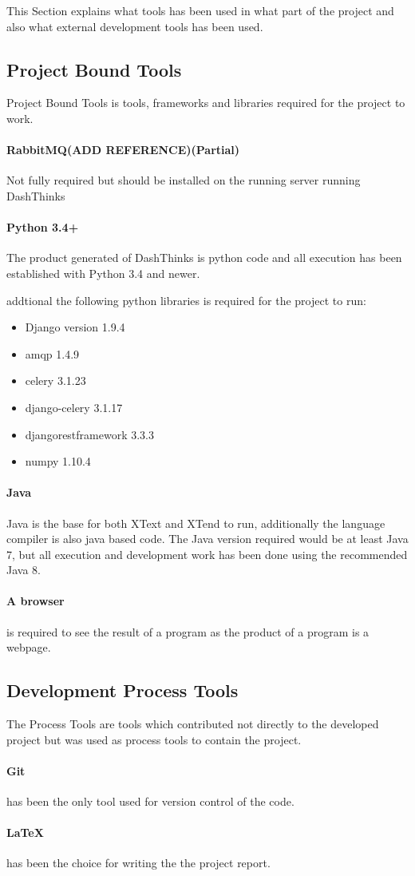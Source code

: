 This Section explains what tools has been used in what part of the project and also
what external development tools has been used.

\subsection{Project Bound Tools}
Project Bound Tools is tools, frameworks and libraries required for the project to work.

\paragraph{RabbitMQ(ADD REFERENCE)(Partial)} Not fully required but should be installed
on the running server running DashThinks
\paragraph{Python 3.4+} The product generated of DashThinks is python code and all execution
has been established with Python 3.4 and newer.

addtional the following python libraries is required for the project to run:
\begin{itemize}
\item Django version 1.9.4
\item amqp 1.4.9
\item celery 3.1.23
\item django-celery 3.1.17
\item djangorestframework 3.3.3
\item numpy 1.10.4
\end{itemize}

\paragraph{Java} Java is the base for both XText and XTend to run, additionally the language
compiler is also java based code. The Java version required would be at least Java 7, but all
execution and development work has been done using the recommended Java 8.

\paragraph{A browser} is required to see the result of a program as the product of a program
is a webpage. 

\subsection{Development Process Tools}
The Process Tools are tools which contributed not directly to the developed project but was
used as process tools to contain the project.

\paragraph{Git} has been the only tool used for version control of the code.

\paragraph{LaTeX} has been the choice for writing the the project report.

